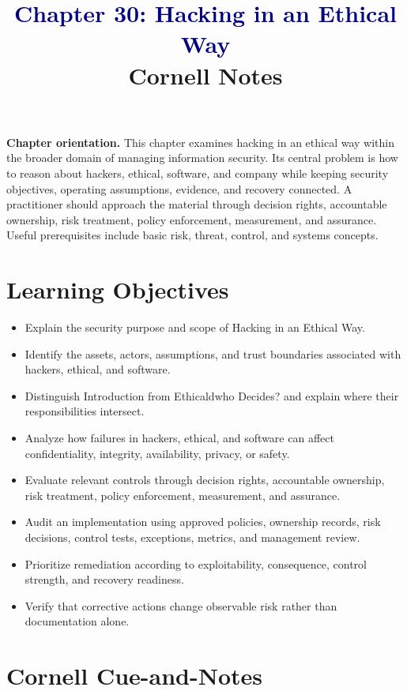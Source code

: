 \documentclass[11pt]{article}
\title{\textcolor{Navy}{Chapter 30: Hacking in an Ethical Way}\\[2mm]\large Cornell Notes}
\author{}
\date{}
\begin{document}
\maketitle
\thispagestyle{fancy}
\vspace{-1.5em}
\begin{orientationbox}
\textbf{Chapter orientation.} This chapter examines hacking in an ethical way within the broader domain of managing information security. Its central problem is how to reason about hackers, ethical, software, and company while keeping security objectives, operating assumptions, evidence, and recovery connected. A practitioner should approach the material through decision rights, accountable ownership, risk treatment, policy enforcement, measurement, and assurance. Useful prerequisites include basic risk, threat, control, and systems concepts.
\end{orientationbox}
\section*{Learning Objectives}
\begin{itemize}
\item Explain the security purpose and scope of Hacking in an Ethical Way.
\item Identify the assets, actors, assumptions, and trust boundaries associated with hackers, ethical, and software.
\item Distinguish Introduction from Ethicaldwho Decides? and explain where their responsibilities intersect.
\item Analyze how failures in hackers, ethical, and software can affect confidentiality, integrity, availability, privacy, or safety.
\item Evaluate relevant controls through decision rights, accountable ownership, risk treatment, policy enforcement, measurement, and assurance.
\item Audit an implementation using approved policies, ownership records, risk decisions, control tests, exceptions, metrics, and management review.
\item Prioritize remediation according to exploitability, consequence, control strength, and recovery readiness.
\item Verify that corrective actions change observable risk rather than documentation alone.
\end{itemize}
\section*{Cornell Cue-and-Notes}
\end{document}
